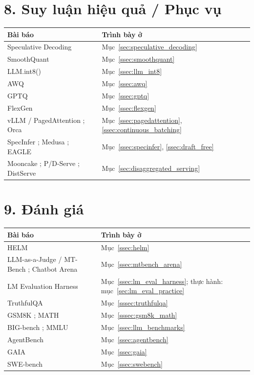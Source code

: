 \section*{8. Suy luận hiệu quả / Phục vụ}
\begin{longtable}{@{}p{7.2cm}p{7.6cm}@{}}
\toprule
\textbf{Bài báo} & \textbf{Trình bày ở} \\
\midrule
\endhead
Speculative Decoding \cite{leviathan2023speculative, chen2023accelerating} & Mục~\ref{sec:speculative_decoding} \\
SmoothQuant \cite{xiao2023smoothquant} & Mục~\ref{ssec:smoothquant} \\
LLM.int8() \cite{dettmers2022llmint8} & Mục~\ref{ssec:llm_int8} \\
AWQ \cite{lin2024awq} & Mục~\ref{ssec:awq} \\
GPTQ \cite{frantar2023gptq} & Mục~\ref{ssec:gptq} \\
FlexGen \cite{sheng2023flexgen} & Mục~\ref{ssec:flexgen} \\
vLLM / PagedAttention \cite{kwon2023vllm}; Orca \cite{yu2022orca} & Mục~\ref{ssec:pagedattention}, \ref{ssec:continuous_batching} \\
SpecInfer \cite{miao2024specinfer}; Medusa \cite{cai2024medusa}; EAGLE \cite{li2024eagle} & Mục~\ref{ssec:specinfer}, \ref{ssec:draft_free} \\
Mooncake \cite{qin2024mooncake}; P/D-Serve \cite{jin2024pdserve}; DistServe \cite{zhong2024distserve} & Mục~\ref{sec:disaggregated_serving} \\
\bottomrule
\end{longtable}

\section*{9. Đánh giá}
\begin{longtable}{@{}p{7.2cm}p{7.6cm}@{}}
\toprule
\textbf{Bài báo} & \textbf{Trình bày ở} \\
\midrule
\endhead
HELM \cite{liang2022helm} & Mục~\ref{ssec:helm} \\
LLM-as-a-Judge / MT-Bench \cite{zheng2023judging}; Chatbot Arena \cite{chiang2024arena} & Mục~\ref{ssec:mtbench_arena} \\
LM Evaluation Harness \cite{biderman2024lessons} & Mục~\ref{ssec:lm_eval_harness}; thực hành: mục~\ref{sec:lm_eval_practice} \\
TruthfulQA \cite{lin2022truthfulqa} & Mục~\ref{sssec:truthfulqa} \\
GSM8K \cite{cobbe2021gsm8k}; MATH \cite{hendrycks2021math} & Mục~\ref{sssec:gsm8k_math} \\
BIG-bench \cite{srivastava2023bigbench}; MMLU \cite{hendrycks2021mmlu} & Mục~\ref{ssec:llm_benchmarks} \\
AgentBench \cite{liu2024agentbench} & Mục~\ref{ssec:agentbench} \\
GAIA \cite{mialon2024gaia} & Mục~\ref{ssec:gaia} \\
SWE-bench \cite{jimenez2024swebench, openai2024sweverified} & Mục~\ref{ssec:swebench} \\
\bottomrule
\end{longtable}

